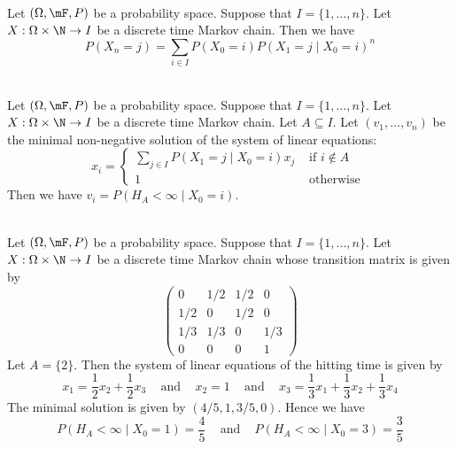 \documentclass[a4paper]{article}
\begin{document}
\begin{prp}{}{}\\
Let $(\Omega,\mF,P)$ be a probability space. Suppose that $I=\{1,\dots,n\}$. Let $X:\Omega\times\N\to I$ be a discrete time Markov chain. Then we have $$P(X_n=j)=\sum_{i\in I}P(X_0=i)P(X_1=j\;|\;X_0=i)^n$$
\end{prp}

\begin{prp}{}{}\\
Let $(\Omega,\mF,P)$ be a probability space. Suppose that $I=\{1,\dots,n\}$. Let $X:\Omega\times\N\to I$ be a discrete time Markov chain. Let $A\subseteq I$. Let $(v_1,\dots,v_n)$ be the minimal non-negative solution of the system of linear equations: $$x_i=\begin{cases}
\sum_{j\in I}P(X_1=j\;|\;X_0=i)x_j & \text{ if }i\notin A\\
1 & \text{ otherwise }
\end{cases}$$
Then we have $v_i=P(H_A<\infty\;|\;X_0=i)$. 
\end{prp}

\begin{eg}{}{}\\
Let $(\Omega,\mF,P)$ be a probability space. Suppose that $I=\{1,\dots,n\}$. Let $X:\Omega\times\N\to I$ be a discrete time Markov chain whose transition matrix is given by $$\begin{pmatrix}
0 & 1/2 & 1/2 & 0\\
1/2 & 0 & 1/2 & 0\\
1/3 & 1/3 & 0 & 1/3\\
0 & 0 & 0 & 1
\end{pmatrix}$$
Let $A=\{2\}$. Then the system of linear equations of the hitting time is given by $$x_1=\frac{1}{2}x_2+\frac{1}{2}x_3\;\;\;\text{ and }\;\;\;x_2=1\;\;\;\text{ and }\;\;\;x_3=\frac{1}{3}x_1+\frac{1}{3}x_2+\frac{1}{3}x_4$$ The minimal solution is given by $(4/5,1,3/5,0)$. Hence we have $$P(H_A<\infty\;|\;X_0=1)=\frac{4}{5}\;\;\;\text{ and }\;\;\;P(H_A<\infty\;|\;X_0=3)=\frac{3}{5}$$
\end{eg}
\end{document}
